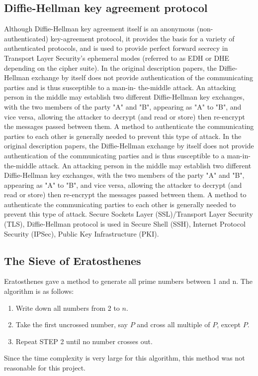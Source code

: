 \documentclass[12pt,journal,compsoc]{IEEEtran}
\begin{document}
\subsection{{Diffie-Hellman key agreement protocol}}
Although Diffie-Hellman\cite{diffie} key agreement itself is an anonymous (non-authenticated) key-agreement protocol, it provides the basis for a variety of authenticated protocols, and is used to provide perfect forward secrecy in Transport Layer Security's ephemeral modes (referred to as EDH or DHE depending on the cipher suite). In the original description papers, the Diffie-Hellman exchange by itself does not provide authentication of the communicating parties and is thus susceptible to a man-in- the-middle attack. An attacking person in the middle may establish two different Diffie-Hellman key exchanges, with the two members of the party "A" and "B", appearing as "A" to "B", and vice versa, allowing the attacker to decrypt \cite{diffie} (and read or store) then re-encrypt the messages passed between them. \cite{diffie} A method to authenticate the communicating parties to each other is generally needed to prevent this type of attack. In the original description papers, the Diffie-Hellman exchange by itself does not provide authentication of the communicating parties and is thus susceptible to a man-in- the-middle attack. An attacking person in the middle may establish two different Diffie-Hellman key exchanges, with the two members of the party "A" and "B", appearing as "A" to "B", and vice versa, allowing the attacker to decrypt \cite{diffie} (and read or store) then re-encrypt the messages passed between them. A method to authenticate the communicating parties to each other is generally needed to prevent this type of attack. Secure Sockets Layer (SSL)/Transport Layer Security (TLS), Diffie-Hellman protocol is used in Secure Shell (SSH), Internet Protocol Security (IPSec), Public Key Infrastructure (PKI).

\subsection{{The Sieve of Eratosthenes}}
Eratosthenes gave a method to generate all prime numbers between 1 and n.\cite{sieve_complexity} The algorithm is as follows:
\begin{enumerate}[ {STEP }1{:}]
\item Write down all numbers from 2 to $n$.
\item Take the first uncrossed number, say $P$ and cross all multiple of $P$, except $P$.
\item Repeat STEP 2 until no number crosses out.
\end{enumerate}
Since the time complexity is very large for this algorithm, this method was not reasonable for this project.
\end{document}

